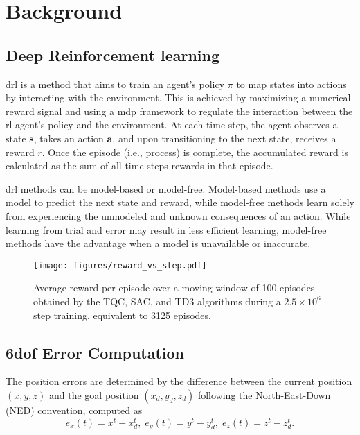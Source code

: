 \section{Background}
\label{sec:background}

\subsection{Deep Reinforcement learning}

\ac{drl} \cite{RichardSutton20} is a method that aims to train an agent's policy $\pi$ to map states into actions by interacting with the environment. This is achieved by maximizing a numerical reward signal and using a \ac{mdp} framework to regulate the interaction between the \ac{rl} agent’s policy and the environment. At each time step, the agent observes a state $\bm{s}$, takes an action $\bm{a}$, and upon transitioning to the next state, receives a reward $r$. Once the episode (i.e., process) is complete, the accumulated reward is calculated as the sum of all time steps rewards in that episode.

\ac{drl} methods can be model-based or model-free. Model-based methods use a model to predict the next state and reward, while model-free methods learn solely from experiencing the unmodeled and unknown consequences of an action. While learning from trial and error may result in less efficient learning, model-free methods have the advantage when a model is unavailable or inaccurate.

\begin{figure}[t!]
\centering
\texttt{[image: figures/reward\_vs\_step.pdf]}%
\caption{Average reward per episode over a moving window of 100 episodes obtained by the TQC, SAC, and TD3 algorithms during a $2.5\times10^6$ step training, equivalent to 3125 episodes.}
\label{fig:rewards}
\end{figure}

\subsection{\ac{6dof} Error Computation}

The position errors are determined by the difference between the current position $(x, y, z)$ and the goal position $(x_d, y_d, z_d)$ following the North-East-Down (NED) convention, computed as
\begin{equation}
    e_x(t) = x^t - x_d^t,\; e_y(t) = y^t - y_d^t,\; e_z(t) = z^t - z_d^t.
\label{eq:errors}
\end{equation}

